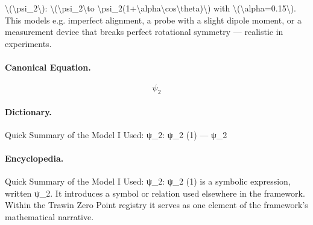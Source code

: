\textbackslash{}(\textbackslash{}psi\_2\textbackslash{}): \textbackslash{}(\textbackslash{}psi\_2\textbackslash{}to \textbackslash{}psi\_2(1+\textbackslash{}alpha\textbackslash{}cos\textbackslash{}theta)\textbackslash{}) with \textbackslash{}(\textbackslash{}alpha=0.15\textbackslash{}). This models e.g. imperfect alignment, a probe with a slight dipole moment, or a measurement device that breaks perfect rotational symmetry — realistic in experiments.

\paragraph{Canonical Equation.}
\[
\psi_2
\]

\paragraph{Dictionary.}
Quick Summary of the Model I Used: ψ\_2: ψ\_2 (1) — ψ\_2

\paragraph{Encyclopedia.}
Quick Summary of the Model I Used: ψ\_2: ψ\_2 (1) is a symbolic expression, written ψ\_2. It introduces a symbol or relation used elsewhere in the framework. Within the Trawin Zero Point registry it serves as one element of the framework's mathematical narrative.
